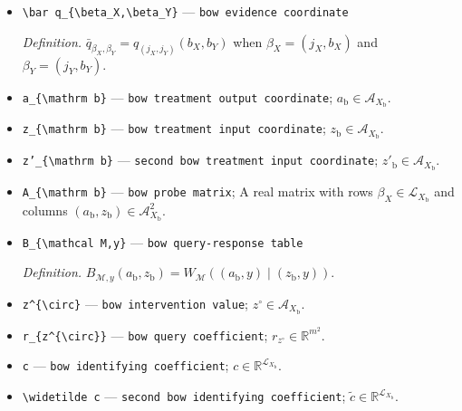 \documentclass{article}
\begin{document}
\begin{itemize}
  \par\smallskip\noindent\emph{Definition.} \(d_y(a_{\mathrm t},z_{\mathrm t})=\mathbf 1\{a_{\mathrm t}=y,\ z_{\mathrm t}=y\}\).
  \item \texttt{\textbackslash{}\allowbreak{}bar q\_\allowbreak{}\{\textbackslash{}\allowbreak{}beta\_\allowbreak{}X,\allowbreak{}\textbackslash{}\allowbreak{}beta\_\allowbreak{}Y\}\allowbreak{}} --- \texttt{bow evidence coordinate}
  \par\smallskip\noindent\emph{Definition.} \(\bar q_{\beta_X,\beta_Y}=q_{(j_X,j_Y)}(b_X,b_Y)\) when \(\beta_X=(j_X,b_X)\) and \(\beta_Y=(j_Y,b_Y)\).
  \item \texttt{a\_\allowbreak{}\{\textbackslash{}\allowbreak{}mathrm b\}\allowbreak{}} --- \texttt{bow treatment output coordinate}; \(a_{\mathrm b}\in\mathcal A_{X_{\mathrm b}}\).
  \item \texttt{z\_\allowbreak{}\{\textbackslash{}\allowbreak{}mathrm b\}\allowbreak{}} --- \texttt{bow treatment input coordinate}; \(z_{\mathrm b}\in\mathcal A_{X_{\mathrm b}}\).
  \item \texttt{z'\_\allowbreak{}\{\textbackslash{}\allowbreak{}mathrm b\}\allowbreak{}} --- \texttt{second bow treatment input coordinate}; \(z'_{\mathrm b}\in\mathcal A_{X_{\mathrm b}}\).
  \item \texttt{A\_\allowbreak{}\{\textbackslash{}\allowbreak{}mathrm b\}\allowbreak{}} --- \texttt{bow probe matrix}; A real matrix with rows \(\beta_X\in\mathcal L_{X_{\mathrm b}}\) and columns \((a_{\mathrm b},z_{\mathrm b})\in\mathcal A_{X_{\mathrm b}}^2\).
  \item \texttt{B\_\allowbreak{}\{\textbackslash{}\allowbreak{}mathcal M,\allowbreak{}y\}\allowbreak{}} --- \texttt{bow query-\allowbreak{}response table}
  \par\smallskip\noindent\emph{Definition.} \(B_{\mathcal M,y}(a_{\mathrm b},z_{\mathrm b})=W_{\mathcal M}((a_{\mathrm b},y)\mid(z_{\mathrm b},y))\).
  \item \texttt{z\textasciicircum{}\{\textbackslash{}\allowbreak{}circ\}\allowbreak{}} --- \texttt{bow intervention value}; \(z^{\circ}\in\mathcal A_{X_{\mathrm b}}\).
  \item \texttt{r\_\allowbreak{}\{z\textasciicircum{}\{\textbackslash{}\allowbreak{}circ\}\allowbreak{}\}\allowbreak{}} --- \texttt{bow query coefficient}; \(r_{z^{\circ}}\in\mathbb R^{m^2}\).
  \item \texttt{c} --- \texttt{bow identifying coefficient}; \(c\in\mathbb R^{\mathcal L_{X_{\mathrm b}}}\).
  \item \texttt{\textbackslash{}\allowbreak{}widetilde c} --- \texttt{second bow identifying coefficient}; \(\widetilde c\in\mathbb R^{\mathcal L_{X_{\mathrm b}}}\).

\end{itemize}
\end{document}
